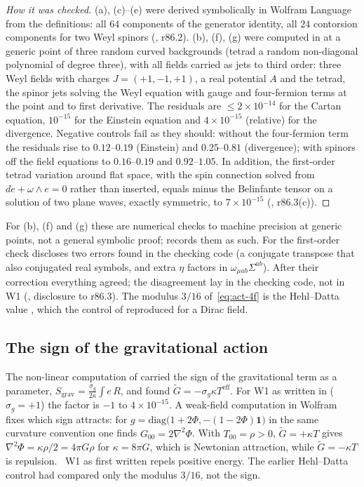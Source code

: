 \begin{proof}[How it was checked]
(a), (c)--(e) were derived symbolically in Wolfram Language from the definitions: all $64$ components of the generator
identity, all $24$ contorsion components for two Weyl spinors (, r86.2). (b), (f), (g) were computed in
 at a generic point of three random curved backgrounds (tetrad a random non-diagonal polynomial of degree three),
with all fields carried as jets to third order: three Weyl fields with charges $J=(+1,-1,+1)$, a real potential $A$ and
the tetrad, the spinor jets solving the Weyl equation with gauge and four-fermion terms at the point and to first
derivative. The residuals are $\le2\times10^{-14}$ for the Cartan equation, $10^{-15}$ for the Einstein equation and
$4\times10^{-15}$ (relative) for the divergence. Negative controls fail as they should: without the four-fermion term the
residuals rise to $0.12$--$0.19$ (Einstein) and $0.25$--$0.81$ (divergence); with spinors off the field equations to
$0.16$--$0.19$ and $0.92$--$1.05$. In addition, the first-order tetrad variation around flat space, with the spin
connection solved from $de+\omega\wedge e=0$ rather than inserted, equals minus the Belinfante tensor on a solution of
two plane waves, exactly symmetric, to $7\times10^{-15}$ (, r86.3(c)).
\end{proof}

For (b), (f) and (g) these are numerical checks to machine precision at generic points, not a general symbolic proof;
 records them as such. For the first-order check  discloses two errors found in the checking code (a
conjugate transpose that also conjugated real symbols, and extra $\eta$ factors in $\omega_{\mu ab}\Sigma^{ab}$). After their
correction everything agreed; the disagreement lay in the checking code, not in W1 (, disclosure to r86.3). The modulus $3/16$ of~\eqref{eq:act-4f} is the
Hehl--Datta value \cite{D:HehlDatta}, which the control of  reproduced for a Dirac field.

\subsection{The sign of the gravitational action}
\label{sec:act-sign}

The non-linear computation of  carried the sign of the gravitational term as a parameter,
$S_{\mathrm{grav}}=\frac{\sigma_g}{2\kappa}\int e\,R$, and found $\tilde G=-\sigma_g\kappa T^{\mathrm{eff}}$. For W1 as written
in  ($\sigma_g=+1$) the factor is $-1$ to $4\times10^{-15}$. A weak-field computation in Wolfram fixes which
sign attracts: for $g=\mathrm{diag}\bigl(1+2\Phi,-(1-2\Phi)\mathbf 1\bigr)$ in the same curvature convention one finds
$G_{00}=2\nabla^2\Phi$. With $T_{00}=\rho>0$, $\tilde G=+\kappa T$ gives $\nabla^2\Phi=\kappa\rho/2=4\pi G\rho$ for
$\kappa=8\pi G$, which is Newtonian attraction, while $\tilde G=-\kappa T$ is repulsion. \Refuted\ W1 as first written
repels positive energy. The earlier Hehl--Datta control had compared only the modulus $3/16$, not the sign.

